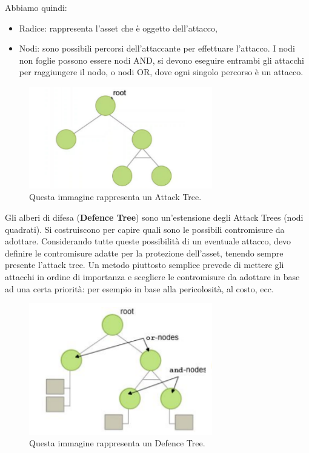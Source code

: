 Abbiamo quindi:

\begin{itemize}
    \item Radice: rappresenta l'asset che è oggetto dell'attacco,
    \item Nodi: sono possibili percorsi dell'attaccante per effettuare l'attacco.
          I nodi non foglie possono essere nodi AND, si devono eseguire entrambi
          gli attacchi per raggiungere il nodo, o nodi OR, dove ogni singolo
          percorso è un attacco.
\end{itemize}

\begin{figure}[H]
    \centering
    \includegraphics[width=8cm, keepaspectratio]{capitoli/risks/imgs/atree.png}
    \caption{Questa immagine rappresenta un Attack Tree.}
\end{figure}

Gli alberi di difesa (\textbf{Defence Tree}) sono un'estensione degli
Attack Trees (nodi quadrati). Si costruiscono per capire
quali sono le possibili contromisure da adottare.
Considerando tutte queste possibilità di un eventuale attacco,
devo definire le contromisure adatte per la protezione
dell'asset, tenendo sempre presente l'attack tree.
Un metodo piuttosto semplice prevede di mettere gli attacchi
in ordine di importanza e scegliere le contromisure da
adottare in base ad una certa priorità: per esempio in base
alla pericolosità, al costo, ecc.

\begin{figure}[H]
    \centering
    \includegraphics[width=8cm, keepaspectratio]{capitoli/risks/imgs/dtree.png}
    \caption{Questa immagine rappresenta un Defence Tree.}
\end{figure}

